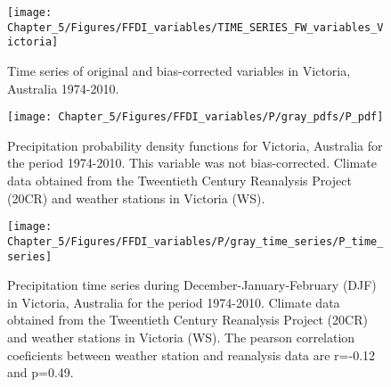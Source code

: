 \begin{figure}[h]
\noindent \begin{centering}
\texttt{[image: Chapter\_5/Figures/FFDI\_variables/TIME\_SERIES\_FW\_variables\_Victoria]}
\par\end{centering}

\caption[Time series of original and bias-corrected variables in Victoria,
Australia 1974-2010]{Time series of original and bias-corrected variables in Victoria,
Australia 1974-2010. \label{fig:Time series of original and bias-corrected variables in Victoria, Australia 1974-2010} }


\end{figure}


\begin{figure}[h]
\noindent \begin{centering}
\texttt{[image: Chapter\_5/Figures/FFDI\_variables/P/gray\_pdfs/P\_pdf]}
\par\end{centering}

\caption[Precipitation probability density functions for Victoria, Australia
for the period 1974-2010]{Precipitation probability density functions for Victoria, Australia
for the period 1974-2010. This variable was not bias-corrected. Climate
data obtained from the Tweentieth Century Reanalysis Project (20CR)
and weather stations in Victoria (WS). \label{fig:Precipitation probability density functions for Victoria, Australia for the period 1974-2010}}
\end{figure}


\begin{figure}[h]
\noindent \begin{centering}
\texttt{[image: Chapter\_5/Figures/FFDI\_variables/P/gray\_time\_series/P\_time\_series]}
\par\end{centering}

\caption[Precipitation time series during December-January-February (DJF) in
Victoria, Australia for the period 1974-2010]{Precipitation time series during December-January-February (DJF) in
Victoria, Australia for the period 1974-2010. Climate data obtained
from the Tweentieth Century Reanalysis Project (20CR) and weather
stations in Victoria (WS). The pearson correlation coeficients between
weather station and reanalysis data are r=-0.12 and p=0.49. \label{fig:Precipitation time series during December-January-February in Victoria, Australia for the period 1974-2010}}


\end{figure}



